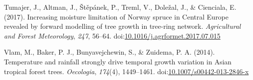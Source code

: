 \documentclass[
]{article}
\newlength{\cslhangindent}
\newenvironment{cslreferences}%
  {\setlength{\parindent}{0pt}%
  \everypar{\setlength{\hangindent}{\cslhangindent}}\ignorespaces}%
  {\par}
\begin{document}
\begin{cslreferences}
\leavevmode\hypertarget{ref-tumajer_increasing_2017}{}%
Tumajer, J., Altman, J., Štěpánek, P., Treml, V., Doležal, J., \&
Cienciala, E. (2017). Increasing moisture limitation of Norway spruce in
Central Europe revealed by forward modelling of tree growth in tree-ring
network. \emph{Agricultural and Forest Meteorology}, \emph{247}, 56--64.
doi:\href{https://doi.org/10.1016/j.agrformet.2017.07.015}{10.1016/j.agrformet.2017.07.015}

\leavevmode\hypertarget{ref-vlam_temperature_2014}{}%
Vlam, M., Baker, P. J., Bunyavejchewin, S., \& Zuidema, P. A. (2014).
Temperature and rainfall strongly drive temporal growth variation in
Asian tropical forest trees. \emph{Oecologia}, \emph{174}(4),
1449--1461.
doi:\href{https://doi.org/10.1007/s00442-013-2846-x}{10.1007/s00442-013-2846-x}
\end{cslreferences}
\end{document}

